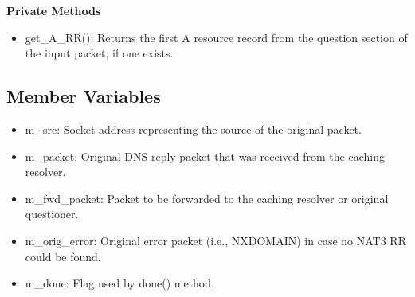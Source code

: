 {\bf Private Methods}
\begin{itemize}
\item get\_A\_RR(): Returns the first A resource record from the question section of the input packet, if one exists.
\end{itemize}

\subsection{Member Variables}
\begin{itemize}
\item m\_src: Socket address representing the source of the original packet.
\item m\_packet: Original DNS reply packet that was received from the caching resolver.
\item m\_fwd\_packet: Packet to be forwarded to the caching resolver or original questioner.
\item m\_orig\_error: Original error packet (i.e., NXDOMAIN) in case no NAT3 RR could be found.
\item m\_done: Flag used by done() method.
\end{itemize}
